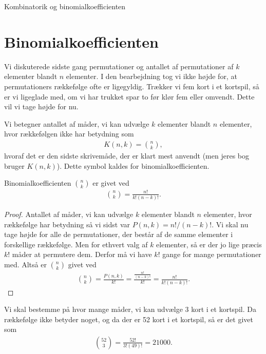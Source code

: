 \begin{center}
\Huge
Kombinatorik og binomialkoefficienten
\end{center}

\section*{Binomialkoefficienten}
Vi diskuterede sidste gang permutationer og antallet af permutationer af $k$ elementer blandt $n$ elementer. I den bearbejdning tog vi ikke højde for, at permutationers rækkefølge ofte er ligegyldig. Trækker vi fem kort i et kortspil, så er vi ligeglade med, om vi har trukket spar to før klør fem eller omvendt. Dette vil vi tage højde for nu. 

\begin{defn}
Vi betegner antallet af måder, vi kan udvælge $k$ elementer blandt $n$ elementer, hvor rækkefølgen ikke har betydning som
\begin{align*}
K(n,k) = \binom{n}{k},
\end{align*}
hvoraf det er den sidste skrivemåde, der er klart mest anvendt (men jeres bog bruger $K(n,k)$). Dette symbol kaldes for binomialkoefficienten.
\end{defn}
\begin{setn}
Binomialkoefficienten $\binom{n}{k}$ er givet ved
\begin{align*}
\binom{n}{k} = \frac{n!}{k!(n-k)!}.
\end{align*}
\end{setn}
\begin{proof}
Antallet af måder, vi kan udvælge $k$ elementer blandt $n$ elementer, hvor rækkefølge har betydning så vi sidst var $P(n,k) = n!/(n-k)!$. Vi skal nu tage højde for alle de permutationer, der består af de samme elementer i forskellige rækkefølge. Men for ethvert valg af $k$ elementer, så er der jo lige præcis $k!$ måder at permutere dem. Derfor må vi have $k!$ gange for mange permutationer med. Altså er $\binom{n}{k}$ givet ved
\begin{align*}
 \binom{n}{k} = \frac{P(n,k)}{k!} = \frac{\frac{n!}{(n-k)!}}{k!} = \frac{n!}{k!(n-k)!}.
\end{align*}
\end{proof}

\begin{exa}
Vi skal bestemme på hvor mange måder, vi kan udvælge 3 kort i et kortspil. Da rækkefølge ikke betyder noget, og da der er 52 kort i et kortspil, så er det givet som
\begin{align*}
\binom{52}{3} = \frac{52!}{3!(49)!} = 21000.
\end{align*}
\end{exa}

